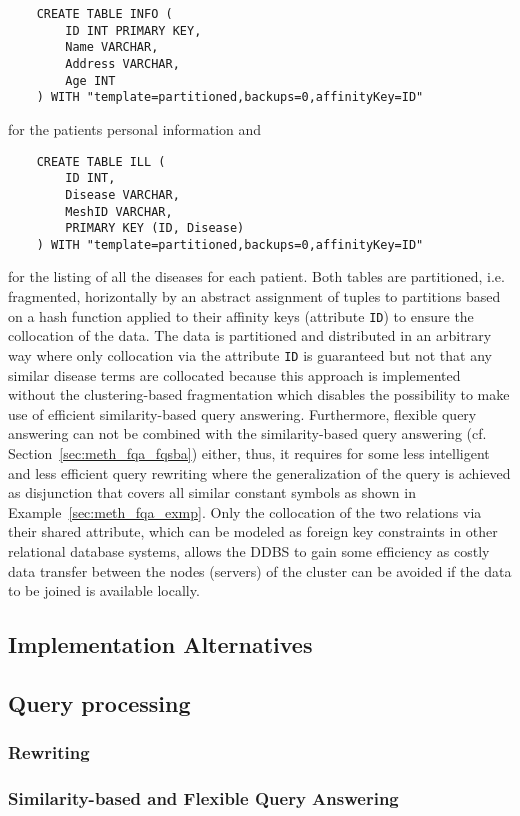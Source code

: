 \begin{verbatim}
    CREATE TABLE INFO (
        ID INT PRIMARY KEY,
        Name VARCHAR,
        Address VARCHAR,
        Age INT
    ) WITH "template=partitioned,backups=0,affinityKey=ID"
\end{verbatim}
for the patients personal information and
\begin{verbatim}
    CREATE TABLE ILL (
        ID INT,
        Disease VARCHAR,
        MeshID VARCHAR,
        PRIMARY KEY (ID, Disease)
    ) WITH "template=partitioned,backups=0,affinityKey=ID"
\end{verbatim}
for the listing of all the diseases for each patient. Both tables are partitioned, i.e. fragmented, horizontally by an abstract assignment of tuples to
partitions based on a hash function applied to their affinity keys (attribute \verb!ID!) to ensure the collocation of the data. The data is partitioned and 
distributed in an arbitrary way where only collocation via the attribute \verb!ID! is guaranteed but not that any similar disease terms are collocated because
this approach is implemented without the clustering-based fragmentation which disables the possibility to make use of efficient similarity-based query
answering. Furthermore, flexible query answering can not be combined with the similarity-based query answering (cf. Section~\ref{sec:meth_fqa_fqsba}) either,
thus, it requires for some less intelligent and less efficient query rewriting where the generalization of the query is achieved as disjunction that covers all
similar constant symbols as shown in Example~\ref{sec:meth_fqa_exmp}. Only the collocation of the two relations via their shared attribute, which can be 
modeled as foreign key constraints in other relational database systems, allows the DDBS to gain some efficiency as costly data transfer between the nodes
(servers) of the cluster can be avoided if the data to be joined is available locally.

\subsection{Implementation Alternatives}
\label{sec:impl_alter}




\subsection{Query processing}
\label{sec:impl_qpro}

\subsubsection{Rewriting}

\subsubsection{Similarity-based and Flexible Query Answering}